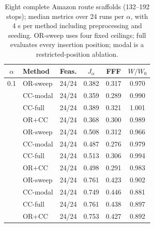 \begin{table}[t]
\centering
\caption{Eight complete Amazon route scaffolds (132--192 stops); median metrics over 24 runs per $\alpha$, with 4 s per method including preprocessing and seeding. OR-sweep uses four fixed ceilings; full evaluates every insertion position; modal is a restricted-position ablation.}
\label{tab:external-v4}
\footnotesize
\setlength{\tabcolsep}{2.7pt}
\begin{tabular}{clcccc}
\toprule
$\alpha$ & Method & Feas. & $J_\alpha$ & FFF & $W/W_0$ \\
\midrule
0.1 & OR-sweep & 24/24 & 0.382 & 0.317 & 0.970 \\
 & CC-modal & 24/24 & 0.359 & 0.289 & 0.990 \\
 & CC-full & 24/24 & 0.389 & 0.321 & 1.001 \\
 & OR+CC & 24/24 & 0.368 & 0.300 & 0.989 \\
\addlinespace[2pt]
0.3 & OR-sweep & 24/24 & 0.508 & 0.312 & 0.966 \\
 & CC-modal & 24/24 & 0.487 & 0.276 & 0.979 \\
 & CC-full & 24/24 & 0.513 & 0.306 & 0.994 \\
 & OR+CC & 24/24 & 0.498 & 0.291 & 0.983 \\
\addlinespace[2pt]
0.7 & OR-sweep & 24/24 & 0.761 & 0.423 & 0.902 \\
 & CC-modal & 24/24 & 0.749 & 0.446 & 0.881 \\
 & CC-full & 24/24 & 0.761 & 0.438 & 0.897 \\
 & OR+CC & 24/24 & 0.753 & 0.427 & 0.892 \\
\bottomrule
\end{tabular}
\end{table}
